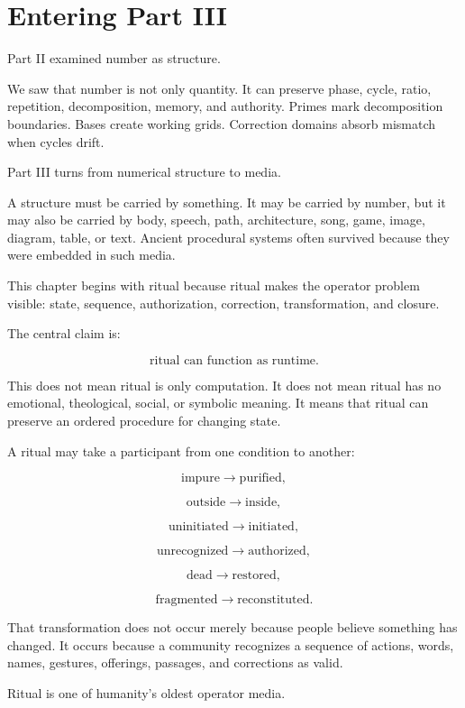 \documentclass[11pt]{book}
\begin{document}
\section{Entering Part III}

Part II examined number as structure.

We saw that number is not only quantity. It can preserve phase, cycle, ratio, repetition, decomposition, memory, and authority. Primes mark decomposition boundaries. Bases create working grids. Correction domains absorb mismatch when cycles drift.

Part III turns from numerical structure to media.

A structure must be carried by something. It may be carried by number, but it may also be carried by body, speech, path, architecture, song, game, image, diagram, table, or text. Ancient procedural systems often survived because they were embedded in such media.

This chapter begins with ritual because ritual makes the operator problem visible: state, sequence, authorization, correction, transformation, and closure.

The central claim is:

\[
\text{ritual can function as runtime}.
\]

This does not mean ritual is only computation. It does not mean ritual has no emotional, theological, social, or symbolic meaning. It means that ritual can preserve an ordered procedure for changing state.

A ritual may take a participant from one condition to another:

\[
\text{impure} \rightarrow \text{purified},
\]

\[
\text{outside} \rightarrow \text{inside},
\]

\[
\text{uninitiated} \rightarrow \text{initiated},
\]

\[
\text{unrecognized} \rightarrow \text{authorized},
\]

\[
\text{dead} \rightarrow \text{restored},
\]

\[
\text{fragmented} \rightarrow \text{reconstituted}.
\]

That transformation does not occur merely because people believe something has changed. It occurs because a community recognizes a sequence of actions, words, names, gestures, offerings, passages, and corrections as valid.

Ritual is one of humanity's oldest operator media.
\end{document}
